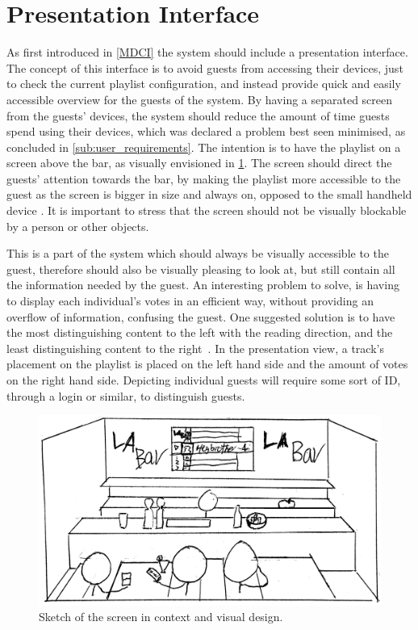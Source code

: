 \section{Presentation Interface}
As first introduced in \cref{MDCI} the system should include a presentation interface. The concept of this interface is to avoid guests from accessing their devices, just to check the current playlist configuration, and instead provide quick and easily accessible overview for the guests of the system. By having a separated screen from the guests' devices, the system should reduce the amount of time guests spend using their devices, which was declared a problem best seen minimised, as concluded in \cref{sub:user_requirements}. The intention is to have the playlist on a screen above the bar, as visually envisioned in \cref{fig:PresentationInterface}. The screen should direct the guests' attention towards the bar, by making the playlist more accessible to the guest as the screen is bigger in size and always on, opposed to the small handheld device \cite{DEB}. It is important to stress that the screen should not be visually blockable by a person or other objects.

This is a part of the system which should always be visually accessible to the guest, therefore should also be visually pleasing to look at, but still contain all the information needed by the guest. An interesting problem to solve, is having to display each individual's votes in an efficient way, without providing an overflow of information, confusing the guest. One suggested solution is to have the most distinguishing content to the left with the reading direction, and the least distinguishing content to the right~\cite{material}. In the presentation view, a track's placement on the playlist is placed on the left hand side and the amount of votes on the right hand side. Depicting individual guests will require some sort of ID, through a login or similar, to distinguish guests.

\begin{figure}[hbtp]
  \centering
  \includegraphics[width=1.0\linewidth]{Images/presentation.png}
  \caption{Sketch of the screen in context and visual design.}\label{fig:PresentationInterface}
\end{figure}

